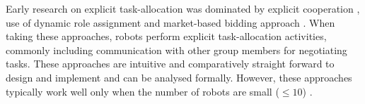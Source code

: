 \documentclass[journal]{IEEEtran}
\begin{document}
Early research on explicit task-allocation was dominated by explicit cooperation \cite{Parker2008}, use of dynamic role assignment \cite{Chaimowicz2002} and market-based bidding approach \cite{Dias+2006}. When taking these approaches, robots perform explicit task-allocation activities, commonly including communication with other group members for negotiating tasks. These approaches are intuitive and comparatively straight forward to design and implement and can be analysed formally. However, these approaches typically work well only when the number of robots are small ($\leq 10$) \cite{Lerman+2006}.
\end{document}
